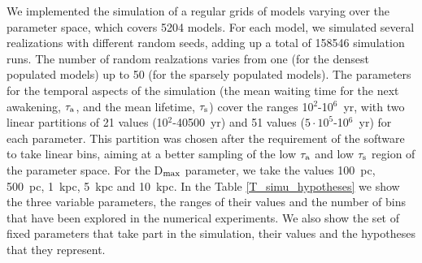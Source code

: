 \documentclass[crop]{CSLB}
\begin{document}
We implemented the simulation of a regular grids of models varying
over the parameter space, which covers 5204 models.
%
For each model, we simulated several realizations with different
random seeds, adding up a total of 158546 simulation runs.
%
The number of random realzations varies from one (for the densest
populated models) up to 50 (for the sparsely populated models).
%
The parameters for the temporal aspects of the simulation (the mean
waiting time for the next awakening, $\tau_{\rm a}$, and the mean
lifetime, $\tau_{\rm s}$) cover the ranges 10$^2$-10$^6$~yr, with two
linear partitions of 21 values (10$^2$-40500~yr) and 51 values
($5\cdot10^5$-10$^6$~yr) for each parameter.
%
This partition was chosen after the requirement of the software to
take linear bins, aiming at a better sampling of the low $\tau_{\rm
a}$ and low $\tau_{\rm s}$ region of the parameter space.
%
For the D$_{\rm max}$ parameter, we take the values 100~pc, 500~pc,
1~kpc, 5~kpc and 10~kpc.
%
In the Table \ref{T_simu_hypotheses} we show the three variable
parameters, the ranges of their values and the number of bins that
have been explored in the numerical experiments.
%
We also show the set of fixed parameters that take part in the
simulation, their values and the hypotheses that they represent.
\end{document}
